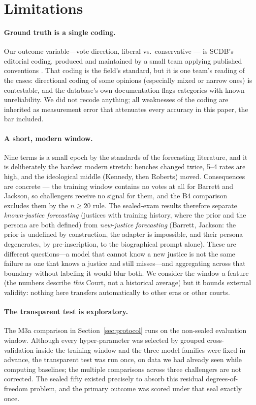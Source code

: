 \section{Limitations}\label{sec:limitations}

\paragraph{Ground truth is a single coding.}
Our outcome variable---vote direction, liberal vs.\ conservative
--- is SCDB's editorial coding, produced and maintained by a small
team applying published conventions \citep{spaeth2025}. That coding
is the field's standard, but it is one team's reading of the cases:
directional coding of some opinions (especially mixed or narrow
ones) is contestable, and the database's own documentation flags
categories with known unreliability. We did not recode anything;
all weaknesses of the coding are inherited as measurement error
that attenuates every accuracy in this paper, the bar included.

\paragraph{A short, modern window.}
Nine terms is a small epoch by the standards of the forecasting
literature, and it is deliberately the hardest modern stretch:
benches changed twice, 5--4 rates are high, and the ideological
middle (Kennedy, then Roberts) moved. Consequences are concrete ---
the training window contains no votes at all for Barrett and
Jackson, so challengers receive no signal for them, and the B4
comparison excludes them by the $n \ge 20$ rule. The sealed-exam
results therefore separate \emph{known-justice forecasting} (justices
with training history, where the prior and the persona are both
defined) from \emph{new-justice forecasting} (Barrett, Jackson: the
prior is undefined by construction, the adapter is impossible, and
their persona degenerates, by pre-inscription, to the biographical
prompt alone). These are
different questions---a model that cannot know a new justice is not
the same failure as one that knows a justice and still misses---and
aggregating across that boundary without labeling it would blur
both. We consider the window a
feature (the numbers describe \emph{this} Court, not a historical
average) but it bounds external validity: nothing here transfers
automatically to other eras or other courts.

\paragraph{The transparent test is exploratory.}
The M3a comparison in Section~\ref{sec:protocol} runs on the
non-sealed evaluation window. Although every hyper-parameter was
selected by grouped cross-validation inside the training window and
the three model families were fixed in advance, the transparent
test was run once, on data we had already seen while computing
baselines; the multiple comparisons across three challengers are
not corrected. The sealed fifty existed precisely to absorb this
residual degrees-of-freedom problem, and the primary outcome was
scored under that seal exactly once.

